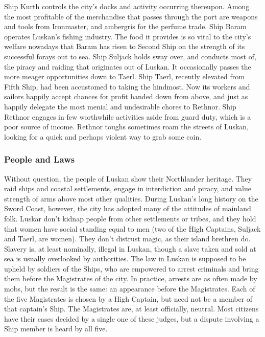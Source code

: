 \documentclass[10pt,a4paper,twoside,twocolumn,openany,bg=print,nodeprecatedcode]{dndbook}
\begin{document}
Ship Kurth controls the city's docks and activity occurring thereupon. Among the most profitable of the merchandise that passes through the port are weapons and tools from Ironmaster, and ambergris for the perfume trade.
Ship Baram operates Luskan's fishing industry. The food it provides is so vital to the city's welfare nowadays that Baram has risen to Second Ship on the strength of its successful forays out to sea.
Ship Suljack holds sway over, and conducts most of, the piracy and raiding that originates out of Luskan. It occasionally passes the more meager opportunities down to Taerl.
Ship Taerl, recently elevated from Fifth Ship, had been accustomed to taking the hindmost. Now its workers and sailors happily accept chances for profit handed down from above, and just as happily delegate the most menial and undesirable chores to Rethnor.
Ship Rethnor engages in few worthwhile activities aside from guard duty, which is a poor source of income. Rethnor toughs sometimes roam the streets of Luskan, looking for a quick and perhaps violent way to grab some coin.
\subsubsection{People and Laws}
Without question, the people of Luskan show their Northlander heritage. They raid ships and coastal settlements, engage in interdiction and piracy, and value strength of arms above most other qualities. During Luskan's long history on the Sword Coast, however, the city has adopted many of the attitudes of mainland folk. Luskar don't kidnap people from other settlements or tribes, and they hold that women have social standing equal to men (two of the High Captains, Suljack and Taerl, are women). They don't distrust magic, as their island brethren do. Slavery is, at least nominally, illegal in Luskan, though a slave taken and sold at sea is usually overlooked by authorities.
The law in Luskan is supposed to be upheld by soldiers of the Ships, who are empowered to arrest criminals and bring them before the Magistrates of the city. In practice, arrests are as often made by mobs, but the result is the same: an appearance before the Magistrates. Each of the five Magistrates is chosen by a High Captain, but need not be a member of that captain's Ship. The Magistrates are, at least officially, neutral. Most citizens have their cases decided by a single one of these judges, but a dispute involving a Ship member is heard by all five.
\end{document}
